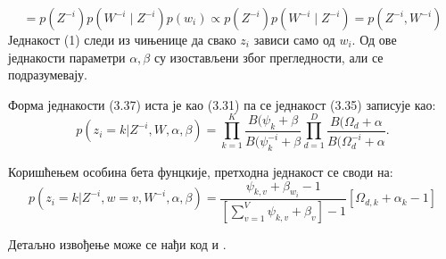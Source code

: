 \begin{equation}
=p(Z^{-i})p(W^{-i} \mid Z^{-i})p(w_i) \propto  p(Z^{-i})p(W^{-i} \mid Z^{-i})  = p(Z^{-i},W^{-i})
\end{equation}
Једнакост (1) следи из чињенице да свако $z_i$ зависи само од $w_i$. Од ове једнакости параметри $\alpha, \beta$ су изостављени због прегледности, али се подразумевају.

Форма једнакости (3.37) иста је као (3.31) па се једнакост (3.35) записује као:
\begin{equation}
p(z_i=k|Z^{-i},W,\alpha,\beta) = \prod_{k=1}^K\frac{B(\psi_k + \beta}{B(\psi_k^{-i}+\beta}\prod_{d=1}^D\frac{B(\Omega_d + \alpha}{B(\Omega_d^{-i} + \alpha}.
\end{equation}

Коришћењем особина бета фунцкије, претходна једнакост се своди на:
\begin{equation}
p(z_i=k|Z^{-i},w=v,W^{-i},\alpha,\beta) = \frac{\psi_{k,v}+\beta_{w_i}-1}{\left[ \sum_{v=1}^V \psi_{k,v}+\beta_v \right] -1}\left[\Omega_{d,k}+\alpha_k-1 \right]
\end{equation}

Детаљно извођење може се нађи код \cite{verov9} и \cite{verov10}.

